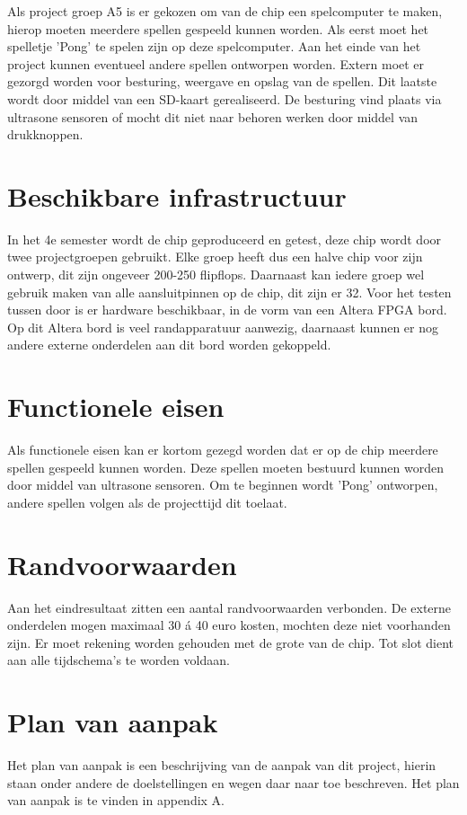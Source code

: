 \documentclass[oneside,dutch]{tudelft-report}
\begin{document}
Als project groep A5 is er gekozen om van de chip een spelcomputer te maken, hierop moeten meerdere spellen gespeeld kunnen worden. Als eerst moet het spelletje 'Pong' te spelen zijn op deze spelcomputer. Aan het einde van het project kunnen eventueel andere spellen ontworpen worden. Extern moet er gezorgd worden voor besturing, weergave en opslag van de spellen. Dit laatste wordt door middel van een SD-kaart gerealiseerd. De besturing vind plaats via ultrasone sensoren of mocht dit niet naar behoren werken door middel van drukknoppen.

\section{Beschikbare infrastructuur}
In het 4e semester wordt de chip geproduceerd en getest, deze chip wordt door twee projectgroepen gebruikt. Elke groep heeft dus een halve chip voor zijn ontwerp, dit zijn ongeveer 200-250 flipflops. Daarnaast kan iedere groep wel gebruik maken van alle aansluitpinnen op de chip, dit zijn er 32. Voor het testen tussen door is er hardware beschikbaar, in de vorm van een Altera FPGA bord. Op dit Altera bord is veel randapparatuur aanwezig, daarnaast kunnen er nog andere externe onderdelen aan dit bord worden gekoppeld. 

\section{Functionele eisen}
Als functionele eisen kan er kortom gezegd worden dat er op de chip meerdere spellen gespeeld kunnen worden. Deze spellen moeten bestuurd kunnen worden door middel van ultrasone sensoren. Om te beginnen wordt 'Pong' ontworpen, andere spellen volgen als de projecttijd dit toelaat.

\section{Randvoorwaarden}
Aan het eindresultaat zitten een aantal randvoorwaarden verbonden. De externe onderdelen mogen maximaal 30 á 40 euro kosten, mochten deze niet voorhanden zijn. Er moet rekening worden gehouden met de grote van de chip. Tot slot dient aan alle tijdschema's te worden voldaan.

\section{Plan van aanpak}
Het plan van aanpak is een beschrijving van de aanpak van dit project, hierin staan onder andere de doelstellingen en wegen daar naar toe beschreven. Het plan van aanpak is te vinden in appendix A.
\end{document}
